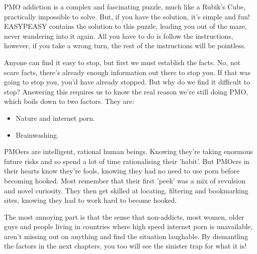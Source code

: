 \documentclass[easypeasy.tex]{subfiles}
\begin{document}
PMO addiction is a complex and fascinating puzzle, much like a Rubik's Cube, practically impossible to solve. But, if you have the solution, it's simple and fun! EASYPEASY contains the solution to this puzzle, leading you out of the maze, never wandering into it again. All you have to do is follow the instructions, however, if you take a wrong turn, the rest of the instructions will be pointless.

Anyone can find it easy to stop, but first we must establish the facts. No, not scare facts, there's already enough information out there to stop you. If that was going to stop you, you'd have already stopped. But why do we find it difficult to stop? Answering this requires us to know the real reason we're still doing PMO, which boils down to two factors. They are:
\begin{itemize}
  \item Nature and internet porn.
  \item Brainwashing.
\end{itemize}

PMOers are intelligent, rational human beings. Knowing they're taking enormous future risks and so spend a lot of time rationalising their 'habit'. But PMOers in their hearts know they're fools, knowing they had no need to use porn before becoming hooked. Most remember that their first 'peek' was a mix of revulsion and novel curiosity. They then get skilled at locating, filtering and bookmarking sites, knowing they had to work hard to become hooked.

The most annoying part is that the sense that non-addicts, most women, older guys and people living in countries where high speed internet porn is unavailable, aren't missing out on anything and find the situation laughable. By dismantling the factors in the next chapters, you too will see the sinister trap for what it is!
\end{document}

